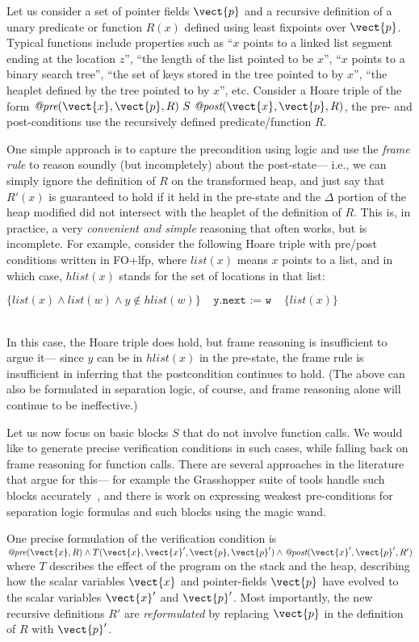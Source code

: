 Let us consider a set of pointer fields $\vect{p}$ and a recursive definition of a unary predicate or function $R(x)$ defined
using least fixpoints over $\vect{p}$. Typical functions include properties such as 
``$x$ points to a linked list segment ending at the location $z$'', ``the length of the list pointed to be $x$'', 
``$x$ points to a binary search tree'', ``the set of keys stored in the tree pointed to by $x$'', ``the heaplet defined
by the tree pointed to by $x$'', etc.
Consider a Hoare triple of the form $\textit{@pre}(\vect{x}, \vect{p}, R) ~S~ \textit{@post}(\vect{x}, \vect{p}, R)$, the pre- and post-conditions use the recursively defined predicate/function $R$.

One simple approach is to capture the precondition using logic and use the \emph{frame rule} to reason soundly
(but incompletely) about the post-state--- i.e., we can simply ignore the definition of $R$
on the transformed heap, and just say that $R'(x)$ is guaranteed to hold if it held in the pre-state and 
the $\Delta$ portion of the heap modified did not intersect with the heaplet of the definition of $R$.
This is, in practice, a very \emph{convenient and simple} reasoning that often works, but is incomplete.
For example, consider the following Hoare triple with pre/post conditions written in FO+lfp,
where $list(x)$ means $x$ points to a list, and in which
case, $hlist(x)$ stands for the set of locations in that list: \\
\centerline{$ \{ list(x) \wedge  list(w) \wedge  y \not \in hlist(w) \} 
~~~~~\texttt{y.next := w}~~~~~
\{list(x) \}$}\\
\noindent In this case, the Hoare triple does hold, but frame reasoning is insufficient to argue it--- since $y$ can be
in $hlist(x)$ in the pre-state, the frame rule is insufficient in inferring that the postcondition continues to hold. 
(The above can also be formulated in separation logic, of course, and frame reasoning alone will continue to be
ineffective.)

Let us now focus on basic blocks $S$ that do not involve function calls. We would like
to generate precise verification conditions in such cases, while falling back on frame reasoning for function calls. 
There are several approaches in the literature that argue for this--- for example the Grasshopper suite of tools
handle such blocks accurately~\cite{}, and there is work on
expressing weakest pre-conditions for separation logic formulas and such blocks 
using the magic wand.

One precise formulation of the verification condition is 
$\textit{@pre}(\vect{x}, R) \wedge T(\vect{x}, \vect{x}', \vect{p}, \vect{p}') \wedge \textit{@post}(\vect{x}', \vect{p}', R')$
where $T$ describes the effect of the program on the stack and the heap, describing how the scalar variables $\vect{x}$ and
 pointer-fields $\vect{p}$ have evolved to the scalar variables $\vect{x}'$ and $\vect{p}'$.
Most importantly, the new recursive definitions $R'$ are \emph{reformulated} by replacing $\vect{p}$ in the definition of $R$
with $\vect{p}'$. 


